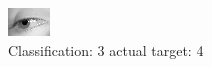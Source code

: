 \begin{figure}[h!]
\begin{center}
\includegraphics[width=0.60\columnwidth]{figures/ID3040_class_3_target_4.png}
\end{center}
\caption{ Classification: 3 actual target: 4}
\label{fig:ID3040_class_3_target_4}
\end{figure}
